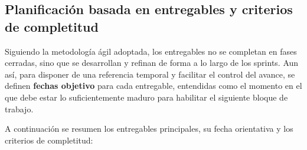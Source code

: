 \documentclass{report}
\begin{document}
\subsection{Planificación basada en entregables y criterios de completitud}

Siguiendo la metodología ágil adoptada, los entregables no se completan en fases cerradas, sino que se desarrollan y refinan de forma a lo largo de los sprints.  
Aun así, para disponer de una referencia temporal y facilitar el control del avance, se definen \textbf{fechas objetivo} para cada entregable, entendidas como el momento en el que debe estar lo suficientemente maduro para habilitar el siguiente bloque de trabajo.

A continuación se resumen los entregables principales, su fecha orientativa y los criterios de completitud:
\end{document}
